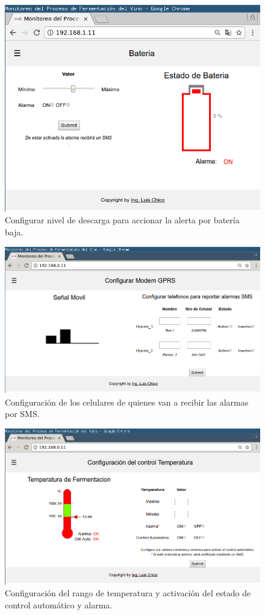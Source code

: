 \begin{figure}[h]
  \centering
  \includegraphics[scale=.25]{./Figures/config_bat.png}
  \caption{Configurar nivel de descarga para accionar la alerta por batería baja.}
  \label{fig:web_bat}
\end{figure}
\begin{figure}[h]
  \centering
  \includegraphics[scale=.25]{./Figures/config_Modem.png}
  \caption{Configuración de los celulares de quienes van a recibir las alarmas por SMS.}
  \label{fig:web_Modem}
\end{figure}
\begin{figure}[h]
  \centering
  \includegraphics[scale=.25]{./Figures/config_temp.png}
  \caption{Configuración del rango de temperatura y activación del estado de control automático y alarma.}
  \label{fig:web_temp}
\end{figure}
